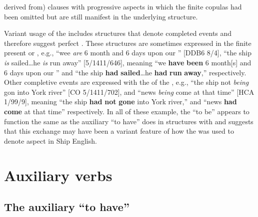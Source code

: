 derived from) clauses with progressive aspects in which the finite copulas had been omitted but are still manifest in the underlying structure. 

Variant usage of the  includes structures that denote completed events and therefore suggest perfect . These structures are sometimes expressed in the finite present or , e.g., “wee \textit{are} 6 month and 6 days upon our ” [DDB6 8/4], “the ship \textit{is} sailed…he \textit{is} run away” [5/1411/646], meaning “we \textbf{have} \textbf{been} 6 month[s] and 6 days upon our ” and “the ship \textbf{had }\textbf{sailed}…he \textbf{had} \textbf{run} \textbf{away},” respectively. Other completive events are expressed with the  of the , e.g., “the  ship not \textit{being} gon into York river” [CO 5/1411/702], and “news \textit{being} come at that time” [HCA 1/99/9], meaning “the  ship \textbf{had} \textbf{not} \textbf{gone} into York river,” and “news \textbf{had} \textbf{come} at that time” respectively. In all of these example, the  “to be” appears to function the same as the auxiliary “to have” does in structures with  and suggests that this exchange may have been a variant feature of how the  was used to denote aspect in Ship English. 

\section{{Auxiliary verbs}}\label{sec:6.4}

\subsection{{The auxiliary “to have”}}\label{sec:6.4.1}

